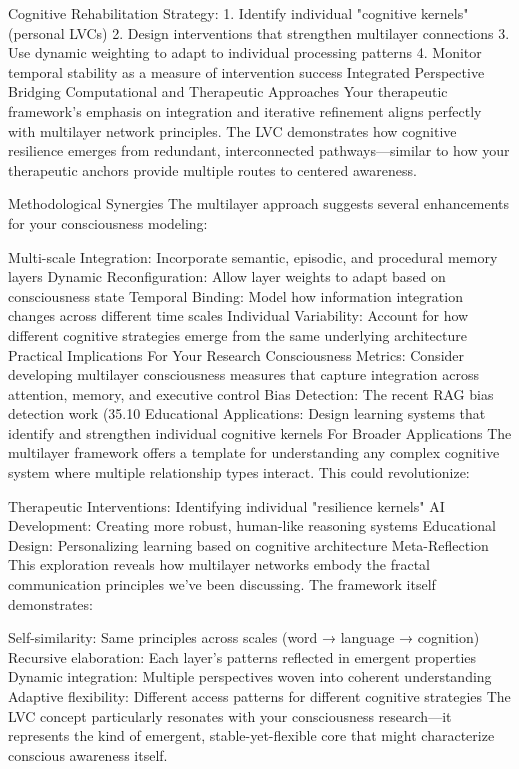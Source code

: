 Cognitive Rehabilitation Strategy:
1. Identify individual "cognitive kernels" (personal LVCs)
2. Design interventions that strengthen multilayer connections
3. Use dynamic weighting to adapt to individual processing patterns
4. Monitor temporal stability as a measure of intervention success
Integrated Perspective
Bridging Computational and Therapeutic Approaches
Your therapeutic framework's emphasis on integration and iterative refinement aligns perfectly with multilayer network principles. The LVC demonstrates how cognitive resilience emerges from redundant, interconnected pathways—similar to how your therapeutic anchors provide multiple routes to centered awareness.

Methodological Synergies
The multilayer approach suggests several enhancements for your consciousness modeling:

Multi-scale Integration: Incorporate semantic, episodic, and procedural memory layers
Dynamic Reconfiguration: Allow layer weights to adapt based on consciousness state
Temporal Binding: Model how information integration changes across different time scales
Individual Variability: Account for how different cognitive strategies emerge from the same underlying architecture
Practical Implications
For Your Research
Consciousness Metrics: Consider developing multilayer consciousness measures that capture integration across attention, memory, and executive control
Bias Detection: The recent RAG bias detection work (35.10%
Educational Applications: Design learning systems that identify and strengthen individual cognitive kernels
For Broader Applications
The multilayer framework offers a template for understanding any complex cognitive system where multiple relationship types interact. This could revolutionize:

Therapeutic Interventions: Identifying individual "resilience kernels"
AI Development: Creating more robust, human-like reasoning systems
Educational Design: Personalizing learning based on cognitive architecture
Meta-Reflection
This exploration reveals how multilayer networks embody the fractal communication principles we've been discussing. The framework itself demonstrates:

Self-similarity: Same principles across scales (word → language → cognition)
Recursive elaboration: Each layer's patterns reflected in emergent properties
Dynamic integration: Multiple perspectives woven into coherent understanding
Adaptive flexibility: Different access patterns for different cognitive strategies
The LVC concept particularly resonates with your consciousness research—it represents the kind of emergent, stable-yet-flexible core that might characterize conscious awareness itself.

